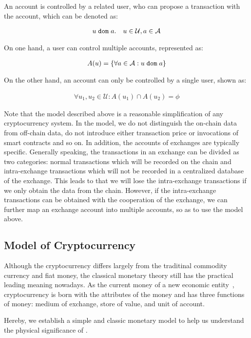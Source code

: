 An account is controlled by a related user, who can propose a transaction with the account, which can be denoted as:

\begin{align}
u {\; \texttt{dom}\;} a. \quad u\in \mathcal{U}, a\in \mathcal{A}
\end{align}

\noindent On one hand, a user can control multiple accounts, represented as:

\begin{align}
A(u) = \{\forall a\in \mathcal{A} : u {\; \texttt{dom}\;} a\}
\end{align}

\noindent On the other hand, an account can only be controlled by a single user, shown as:

\begin{align}
\forall u_1, u_2 \in \mathcal{U} : A(u_1) \cap A(u_2) = \phi
\end{align}

Note that the model described above is a reasonable simplification of any cryptocurrency system. In the model, we do not distinguish the on-chain data from off-chain data, do not introduce either transaction price or invocations of smart contracts and so on. In addition, the accounts of exchanges are typically specific. Generally speaking, the transactions in an exchange can be divided as two categories: normal transactions which will be recorded on the chain and intra-exchange transactions which will not be recorded in a centralized database of the exchange. This leads to that we will lose the intra-exchange transactions if we only obtain the data from the chain. 
However, if the intra-exchange transactions can be obtained with the cooperation of the exchange, we can further map an exchange account into multiple accounts, so as to use the model above.


\subsection{Model of Cryptocurrency}
Although the cryptocurrency differs largely from the traditinal commodity currency and fiat money, the classical monetary theory still has the practical leading meaning nowadays. As the current money of a new economic entity~\cite{swan2015blockchain}, cryptocurrency is born with the attributes of the money and has three functions of money: medium of exchange, store of value, and unit of account. 

Hereby, we establish a simple and classic monetary model to help us understand the physical significance of \nr.


